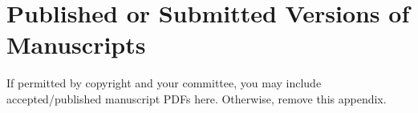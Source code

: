 \chapter{Published or Submitted Versions of Manuscripts}
\label{app:published-versions}

If permitted by copyright and your committee, you may include accepted/published manuscript PDFs here. Otherwise, remove this appendix.

% 
